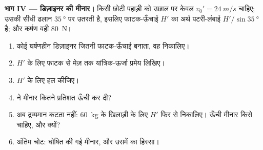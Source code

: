 \begin{problem}
\medskip\noindent\textbf{भाग IV --- डिज़ाइनर की मीनार।}
किसी छोटी पहाड़ी को उछाल पर केवल $v_0' = \qty{24}{m/s}$ चाहिए; उसकी सीधी ढलान $\qty{35}{\degree}$ पर
उतरती है, इसलिए फाटक-ऊँचाई $H'$ का अर्थ पटरी-लंबाई $H'/\sin\qty{35}{\degree}$ है; और कर्षण
वही \qty{80}{N}।
\begin{enumerate}[resume]
  \item कोई घर्षणहीन डिज़ाइनर जितनी फाटक-ऊँचाई बनाता, वह निकालिए।
  \item $H'$ के लिए फाटक से मेज़ तक यांत्रिक-ऊर्जा प्रमेय लिखिए।
  \item $H'$ के लिए हल कीजिए।
  \item {} ने मीनार कितने प्रतिशत ऊँची कर दी?
  \item अब द्रव्यमान कटता नहीं: \qty{60}{kg} के खिलाड़ी के लिए $H'$ फिर से
        निकालिए। ऊँची मीनार किसे चाहिए, और क्यों?
  \item अंतिम चोट: घोषित की गई मीनार, और उसमें  का हिस्सा।
\end{enumerate}
\end{problem}
